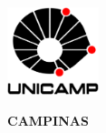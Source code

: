 \thispagestyle{plain}
\includegraphics[width=.94in, height=1in,
keepaspectratio=true]{imagens/logo-unicamp}
\vspace*{1cm}
\begin{center}
  {\Large\textsc{\autor}}
\end{center}
\vspace{4cm}
\begin{center}
  {\Large\textbf{\textsc{\titulo}}}
\end{center}
\vfill
\begin{center}
  \textbf{CAMPINAS \\ \ano}
\end{center}
